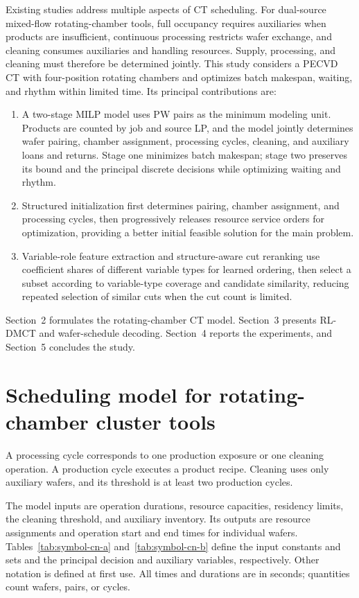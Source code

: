 \documentclass[final,5p,times,twocolumn]{elsarticle}
\begin{document}
Existing studies address multiple aspects of CT scheduling. For dual-source mixed-flow rotating-chamber tools, full occupancy requires auxiliaries when products are insufficient, continuous processing restricts wafer exchange, and cleaning consumes auxiliaries and handling resources. Supply, processing, and cleaning must therefore be determined jointly. This study considers a PECVD CT with four-position rotating chambers and optimizes batch makespan, waiting, and rhythm within limited time. Its principal contributions are:
\begin{enumerate}[leftmargin=*]
\item A two-stage MILP model uses PW pairs as the minimum modeling unit. Products are counted by job and source LP, and the model jointly determines wafer pairing, chamber assignment, processing cycles, cleaning, and auxiliary loans and returns. Stage one minimizes batch makespan; stage two preserves its bound and the principal discrete decisions while optimizing waiting and rhythm.
\item Structured initialization first determines pairing, chamber assignment, and processing cycles, then progressively releases resource service orders for optimization, providing a better initial feasible solution for the main problem.
\item Variable-role feature extraction and structure-aware cut reranking use coefficient shares of different variable types for learned ordering, then select a subset according to variable-type coverage and candidate similarity, reducing repeated selection of similar cuts when the cut count is limited.
\end{enumerate}
Section~2 formulates the rotating-chamber CT model. Section~3 presents RL-DMCT and wafer-schedule decoding. Section~4 reports the experiments, and Section~5 concludes the study.

\section{Scheduling model for rotating-chamber cluster tools}
\setcounter{equation}{0}
A processing cycle corresponds to one production exposure or one cleaning operation. A production cycle executes a product recipe. Cleaning uses only auxiliary wafers, and its threshold is at least two production cycles.

The model inputs are operation durations, resource capacities, residency limits, the cleaning threshold, and auxiliary inventory. Its outputs are resource assignments and operation start and end times for individual wafers. Tables~\ref{tab:symbol-cn-a} and~\ref{tab:symbol-cn-b} define the input constants and sets and the principal decision and auxiliary variables, respectively. Other notation is defined at first use. All times and durations are in seconds; quantities count wafers, pairs, or cycles.
\end{document}
